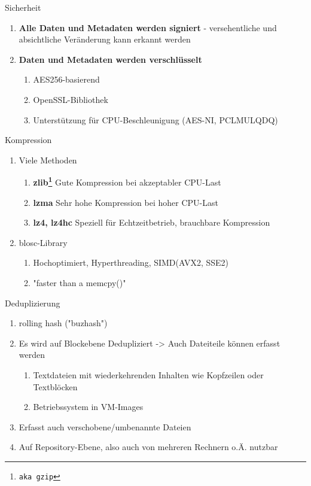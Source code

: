 \documentclass{beamer}
\begin{document}
\begin{frame}{Sicherheit}
  \begin{enumerate}[*]
    \item \textbf{Alle Daten und Metadaten werden signiert} - versehentliche und absichtliche Veränderung kann erkannt werden\pause
    \item \textbf{Daten und Metadaten werden verschlüsselt}\pause
    \begin{enumerate}[>]
    	\item AES256-basierend\pause
        \item OpenSSL-Bibliothek\pause
        \item Unterstützung für CPU-Beschleunigung (AES-NI, PCLMULQDQ)
	\end{enumerate}
  \end{enumerate}
\end{frame}

\begin{frame}{Kompression}
  \begin{enumerate}[*]
    \item Viele Methoden\pause
    \begin{enumerate}[>]
    	\item \textbf{zlib\footnote{\texttt{aka gzip}}}
        Gute Kompression bei akzeptabler CPU-Last\pause
        \item \textbf{lzma}
        Sehr hohe Kompression bei hoher CPU-Last\pause
        \item \textbf{lz4, lz4hc}
        Speziell für Echtzeitbetrieb, brauchbare Kompression\pause
	\end{enumerate}
    \item blosc-Library
    \begin{enumerate}[>]
		\item Hochoptimiert, Hyperthreading, SIMD(AVX2, SSE2)\pause
        \item "faster than a memcpy()"
	\end{enumerate}
  \end{enumerate}
\end{frame}

\begin{frame}{Deduplizierung}
  \begin{enumerate}[*]
    \item rolling hash ("buzhash")\pause
    \item Es wird auf Blockebene Dedupliziert -> Auch Dateiteile können erfasst werden\pause
	\begin{enumerate}[>]
    	\item Textdateien mit wiederkehrenden Inhalten wie Kopfzeilen oder Textblöcken\pause
		\item Betriebssystem in VM-Images\pause
	\end{enumerate}
    \item Erfasst auch verschobene/umbenannte Dateien\pause
    \item Auf Repository-Ebene, also auch von mehreren Rechnern o.Ä. nutzbar
  \end{enumerate}
\end{frame}
\end{document}

